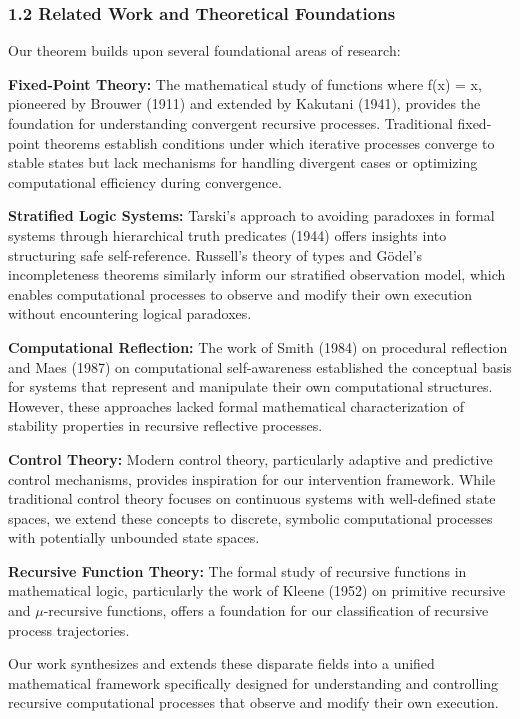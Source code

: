\documentclass[
]{article}
\begin{document}
\subsubsection{1.2 Related Work and Theoretical
Foundations}\label{related-work-and-theoretical-foundations}

Our theorem builds upon several foundational areas of research:

\textbf{Fixed-Point Theory:} The mathematical study of functions where
f(x) = x, pioneered by Brouwer (1911) and extended by Kakutani (1941),
provides the foundation for understanding convergent recursive
processes. Traditional fixed-point theorems establish conditions under
which iterative processes converge to stable states but lack mechanisms
for handling divergent cases or optimizing computational efficiency
during convergence.

\textbf{Stratified Logic Systems:} Tarski's approach to avoiding
paradoxes in formal systems through hierarchical truth predicates (1944)
offers insights into structuring safe self-reference. Russell's theory
of types and Gödel's incompleteness theorems similarly inform our
stratified observation model, which enables computational processes to
observe and modify their own execution without encountering logical
paradoxes.

\textbf{Computational Reflection:} The work of Smith (1984) on
procedural reflection and Maes (1987) on computational self-awareness
established the conceptual basis for systems that represent and
manipulate their own computational structures. However, these approaches
lacked formal mathematical characterization of stability properties in
recursive reflective processes.

\textbf{Control Theory:} Modern control theory, particularly adaptive
and predictive control mechanisms, provides inspiration for our
intervention framework. While traditional control theory focuses on
continuous systems with well-defined state spaces, we extend these
concepts to discrete, symbolic computational processes with potentially
unbounded state spaces.

\textbf{Recursive Function Theory:} The formal study of recursive
functions in mathematical logic, particularly the work of Kleene (1952)
on primitive recursive and \(\mu \)-recursive functions, offers a
foundation for our classification of recursive process trajectories.

Our work synthesizes and extends these disparate fields into a unified
mathematical framework specifically designed for understanding and
controlling recursive computational processes that observe and modify
their own execution.
\end{document}
